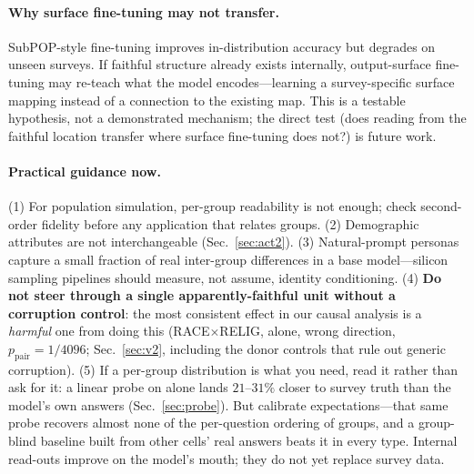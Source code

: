 \paragraph{Why surface fine-tuning may not transfer.}
SubPOP-style fine-tuning \citep{subpop2025} improves in-distribution
accuracy but degrades on unseen surveys. If faithful structure already
exists internally, output-surface fine-tuning may re-teach what the model
encodes---learning a survey-specific surface mapping instead of a
connection to the existing map. This is a testable hypothesis, not a
demonstrated mechanism; the direct test (does reading from the faithful
location transfer where surface fine-tuning does not?) is future work.

\paragraph{Practical guidance now.}
(1) For population simulation, per-group readability is not enough;
check second-order fidelity before any application that relates groups.
(2) Demographic attributes are not interchangeable (Sec.~\ref{sec:act2}). (3) Natural-prompt
personas capture a small fraction of real inter-group differences in a
base model---silicon sampling pipelines should measure, not assume,
identity conditioning. (4) \textbf{Do not steer through a single apparently-faithful unit
without a corruption control}: the most consistent effect in our causal
analysis is a \emph{harmful} one from doing this
(RACE$\times$RELIG, \starhead{} alone, wrong direction,
$p_{\text{pair}}=1/4096$; Sec.~\ref{sec:v2}, including the donor
controls that rule out generic corruption).
(5) If a per-group distribution is what you need, read it rather than
ask for it: a linear probe on \starhead{} alone lands $21$--$31\%$ closer
to survey truth than the model's own answers (Sec.~\ref{sec:probe}). But
calibrate expectations---that same probe recovers almost none of the
per-question ordering of groups, and a group-blind baseline built from
other cells' real answers beats it in every type. Internal read-outs
improve on the model's mouth; they do not yet replace survey data.
